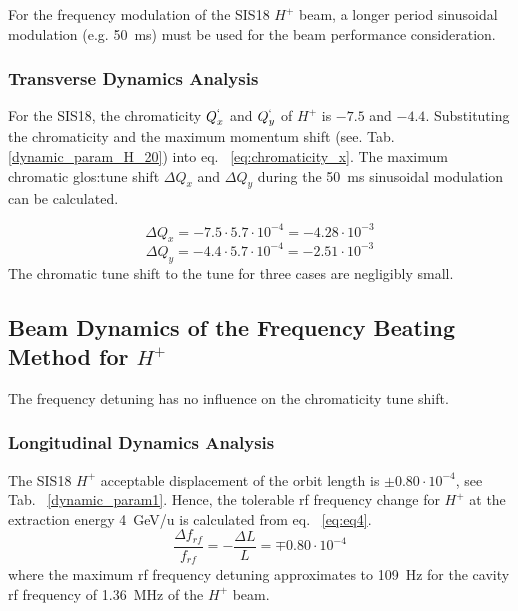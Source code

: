 For the frequency modulation of the SIS18 $H^+$ beam, a longer period sinusoidal modulation (e.g. \SI{50}{ms}) must be used for the beam performance consideration. 
 
	\subsubsection{Transverse Dynamics Analysis}

For the SIS18, the chromaticity $Q^`_x$ and $Q^`_y$ of $H^+$ is $-7.5$ and $-4.4$. Substituting the chromaticity and the maximum momentum shift (see. Tab. \ref{dynamic_param_H_20}) into eq. ~\ref{eq:chromaticity_x}. The maximum chromatic \gls{glos:tune} shift $\Delta Q_x$ and $\Delta Q_y$ during the \SI{50}{ms} sinusoidal modulation can be calculated. 

\begin{equation}
\Delta Q_x = -7.5\cdot 5.7\cdot 10^{-4}=-4.28 \cdot 10^{-3}
\end{equation}
\begin{equation}
\Delta Q_y = -4.4\cdot 5.7\cdot 10^{-4}=-2.51\cdot 10^{-3} 
\end{equation}
The chromatic tune shift to the tune for three cases are negligibly small.

\subsection{Beam Dynamics of the Frequency Beating Method for $H^+$} 
The frequency detuning has no influence on the chromaticity tune shift.

\subsubsection{Longitudinal Dynamics Analysis}

The SIS18 $H^+$ acceptable displacement of the orbit length is $\pm0.80\cdot10^{-4}$, see Tab. ~\ref{dynamic_param1}. Hence, the tolerable rf frequency change for $H^{+}$ at the extraction energy \SI{4}{GeV/u} is calculated from eq. ~\ref{eq:eq4}.
\begin{equation}
\frac{\Delta{f}_\mathit{rf}}{f_\mathit{rf}} = -\frac{\Delta L}{L}= \mp 0.80 \cdot 10^{-4}
\end{equation}
where the maximum rf frequency detuning approximates to \SI{109}{Hz} for the cavity rf frequency of \SI{1.36}{MHz} of the $H^+$ beam.
